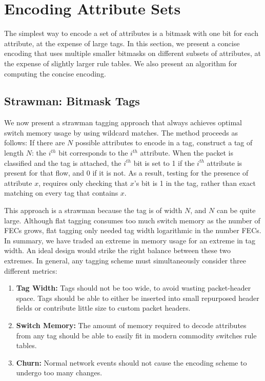 \section{Encoding Attribute Sets}
\label{sec:flextag_encoding} 
The simplest way to encode a set of attributes is a bitmask with one
bit for each attribute, at the expense of large tags.  In this
section, we present a concise encoding that uses multiple smaller
bitmasks on different subsets of attributes, at the expense of
slightly larger rule tables.  We also present an algorithm for
computing the concise encoding.

\subsection{Strawman: Bitmask Tags}

We now present a strawman tagging approach that always achieves optimal
switch memory usage by using wildcard matches. The method proceeds as follows:
If there are $N$ possible attributes to encode in a tag, construct a tag of length $N$: 
the $i^{th}$ bit corresponds to the $i^{th}$ attribute. When the packet is classified
and the tag is attached, the $i^{th}$ bit is set to 1 if the $i^{th}$ attribute
is present for that flow, and 0 if it is not. As a result, testing for
the presence of attribute $x$, requires only checking that $x$'s bit is 1 in the
tag, rather than exact matching on every tag that contains
$x$.

This approach is a strawman because the tag is of width $N$, and $N$ can be quite large.
Although flat tagging consumes too much switch memory as the number of
FECs grows, 
flat tagging only needed tag width logarithmic in the number FECs. In
summary, we have traded an extreme in memory
usage for an extreme in tag width. An ideal design would strike the
right balance between these two extremes.
In general, any tagging scheme must simultaneously consider three different metrics:

\begin{enumerate}
\item \textbf{Tag Width:} Tags should not be too wide, to avoid wasting packet-header space.
Tags should be able to either be inserted into small repurposed header fields or contribute little size to custom packet headers. 
\item \textbf{Switch Memory:} The amount of memory required to decode attributes from any tag should be able to easily fit in modern commodity switches rule tables.
\item \textbf{Churn:} Normal network events should not cause the encoding scheme to undergo too many changes.
\end{enumerate}


